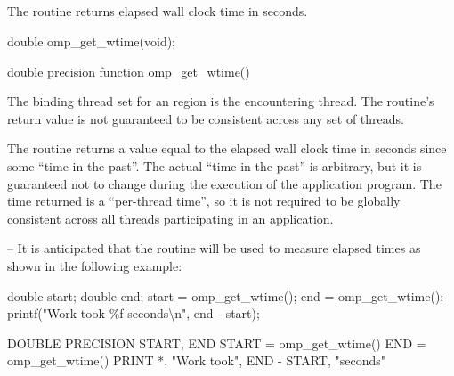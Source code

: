 \subsection{}
\label{subsec:omp_get_wtime}
\summary
The  routine returns elapsed wall clock time in seconds.

\format
\ccppspecificstart
\begin{boxedcode}
double omp\_get\_wtime(void);
\end{boxedcode}
\ccppspecificend

\fortranspecificstart
\begin{boxedcode}
double precision function omp\_get\_wtime()
\end{boxedcode}
\fortranspecificend

\binding
The binding thread set for an  region is the encountering thread. The 
routine’s return value is not guaranteed to be consistent across any set of threads.

\effect
The  routine returns a value equal to the elapsed wall clock time in 
seconds since some ``time in the past''. The actual ``time in the past'' is arbitrary, but it is 
guaranteed not to change during the execution of the application program. The time 
returned is a ``per-thread time'', so it is not required to be globally consistent across all 
threads participating in an application.

\notestart
\noteheader – It is anticipated that the routine will be used to measure elapsed times as shown 
in the following example:

\ccppspecificstart
\begin{boxedcode}
double start;
double end;
start = omp\_get\_wtime();
end = omp\_get\_wtime();
printf("Work took \%f seconds{\textbackslash}n", end - start);
\end{boxedcode}
\ccppspecificend

\fortranspecificstart
\begin{boxedcode}
DOUBLE PRECISION START, END
START = omp\_get\_wtime()
END = omp\_get\_wtime()
PRINT *, "Work took", END - START, "seconds"
\end{boxedcode}
\fortranspecificend
\noteend











